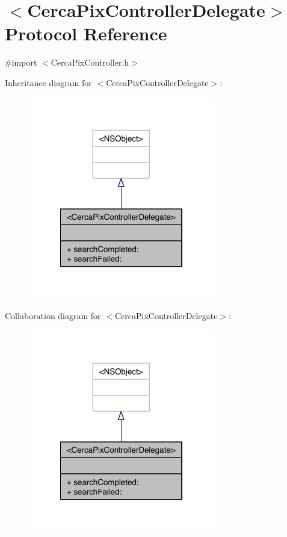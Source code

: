 \hypertarget{protocol_cerca_pix_controller_delegate-p}{\section{$<$Cerca\-Pix\-Controller\-Delegate$>$ Protocol Reference}
\label{protocol_cerca_pix_controller_delegate-p}
}


{\ttfamily \#import $<$Cerca\-Pix\-Controller.\-h$>$}



Inheritance diagram for $<$Cerca\-Pix\-Controller\-Delegate$>$\-:\nopagebreak
\begin{figure}[H]
\begin{center}
\leavevmode
\includegraphics[width=230pt]{protocol_cerca_pix_controller_delegate-p__inherit__graph}
\end{center}
\end{figure}


Collaboration diagram for $<$Cerca\-Pix\-Controller\-Delegate$>$\-:\nopagebreak
\begin{figure}[H]
\begin{center}
\leavevmode
\includegraphics[width=230pt]{protocol_cerca_pix_controller_delegate-p__coll__graph}
\end{center}
\end{figure}
